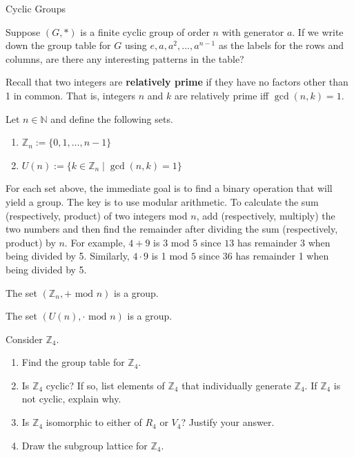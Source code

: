 \begin{section}{Cyclic Groups}
\begin{exercise}
Suppose $(G,*)$ is a finite cyclic group of order $n$ with generator $a$.  If we write down the group table for $G$ using $e, a, a^2, \ldots, a^{n-1}$ as the labels for the rows and columns, are there any interesting patterns in the table?
\end{exercise}

Recall that two integers are \textbf{relatively prime} if they have no factors other than 1 in common.  That is, integers $n$ and $k$ are relatively prime iff $\gcd(n,k)=1$.

\begin{definition}
Let $n\in\mathbb{N}$ and define the following sets.
\begin{enumerate}[label=\rm{(\alph*)}]
\item $\mathbb{Z}_n:=\{0,1,\ldots,n-1\}$
\item $U(n):=\{k\in\mathbb{Z}_n\mid \gcd(n,k)=1\}$
\end{enumerate}
\end{definition}

For each set above, the immediate goal is to find a binary operation that will yield a group.  The key is to use modular arithmetic.  To calculate the sum (respectively, product) of two integers mod $n$, add (respectively, multiply) the two numbers and then find the remainder after dividing the sum (respectively, product) by $n$. For example, $4+9$ is $3$ mod $5$ since $13$ has remainder 3 when being divided by 5.  Similarly, $4\cdot 9$ is 1 mod $5$ since 36 has remainder 1 when being divided by 5.

\begin{theorem}
The set $(\mathbb{Z}_n,+\text{ mod }n)$ is a group.  
\end{theorem}

\begin{theorem}
The set $(U(n),\cdot\text{ mod }n)$ is a group.  
\end{theorem}

\begin{exercise}
Consider $\mathbb{Z}_4$.
\begin{enumerate}[label=\rm{(\alph*)}]
\item Find the group table for $\mathbb{Z}_4$.
\item Is $\mathbb{Z}_4$ cyclic? If so, list elements of $\mathbb{Z}_4$ that individually generate $\mathbb{Z}_4$.  If $\mathbb{Z}_4$ is not cyclic, explain why.
\item Is $\mathbb{Z}_4$ isomorphic to either of $R_4$ or $V_4$? Justify your answer.
\item Draw the subgroup lattice for $\mathbb{Z}_4$.
\end{enumerate}
\end{exercise}


\end{section}
